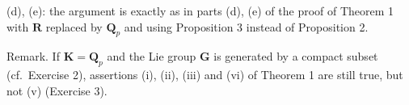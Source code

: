 (d), (e): the argument is exactly as in parts (d), (e) of the proof of Theorem 1 with \(\mathbf{R}\) replaced by \(\mathbf{Q}_p\) and using Proposition 3 instead of Proposition 2.

Remark. If \(\mathbf{K} = \mathbf{Q}_p\) and the Lie group \(\mathbf{G}\) is generated by a compact subset (cf.~Exercise 2), assertions (i), (ii), (iii) and (vi) of Theorem 1 are still true, but not (v) (Exercise 3).


